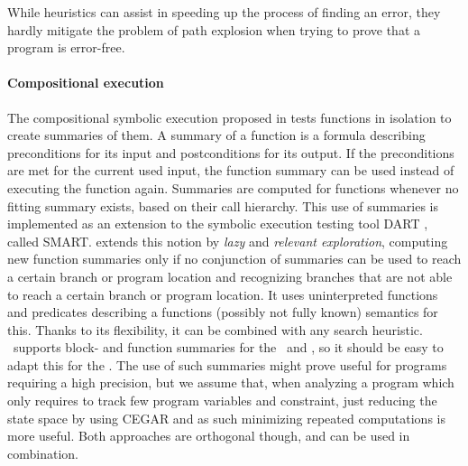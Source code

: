 While heuristics can assist in speeding up the process of finding an error, they hardly mitigate the problem of path explosion when trying to prove that a program is error-free.
\paragraph*{Compositional execution}
The compositional symbolic execution proposed in \cite{Godefroid2007} tests functions in isolation to create summaries of them.
A summary of a function is a formula describing preconditions for its input and postconditions for its output.
If the preconditions are met for the current used input, the function summary can be used instead of executing the function again.
Summaries are computed for functions whenever no fitting summary exists, based on their call hierarchy.
This use of summaries is implemented as an extension to the symbolic execution testing tool DART \cite{Godefroid2005}, called SMART.
\cite{Anand2008} extends this notion by \emph{lazy} and \emph{relevant exploration}, computing new function summaries only if no conjunction of summaries can be used to reach a certain branch or program location and
recognizing branches that are not able to reach a certain branch or program location.
It uses uninterpreted functions and predicates describing a functions (possibly not fully known) semantics for this.
Thanks to its flexibility, it can be combined with any search heuristic.
\CpaChecker\ supports block- and function summaries for the \predicateCPA\ and , so it should be easy to adapt this for the \symbolicExecutionCPA.
The use of such summaries might prove useful for programs requiring a high precision, but we assume that, when analyzing a program which only requires to track few program variables and constraint, just reducing the state space by using CEGAR and as such minimizing repeated computations is more useful.
Both approaches are orthogonal though, and can be used in combination.

